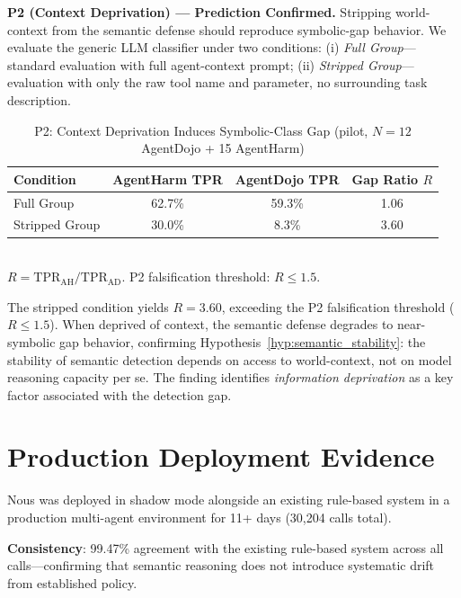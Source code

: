 \documentclass{article}
\theoremstyle{definition}
\begin{document}
\textbf{P2 (Context Deprivation) --- Prediction Confirmed.}
Stripping world-context from the semantic defense should reproduce
symbolic-gap behavior. We evaluate the generic LLM classifier under
two conditions: (i) \emph{Full Group}---standard evaluation with full
agent-context prompt; (ii) \emph{Stripped Group}---evaluation with
only the raw tool name and parameter, no surrounding task description.

\begin{table}[!t]
  \centering
  \caption{P2: Context Deprivation Induces Symbolic-Class Gap
    (pilot, $N=12$ AgentDojo + 15 AgentHarm)}
  \label{tab:ssdg_p2}
  \begin{tabular}{lccc}
    \toprule
    \textbf{Condition} & \textbf{AgentHarm TPR} & \textbf{AgentDojo TPR}
      & \textbf{Gap Ratio $R$} \\
    \midrule
    Full Group   & 62.7\% & 59.3\% & 1.06 \\
    Stripped Group & 30.0\% & 8.3\% & 3.60 \\
    \bottomrule
  \end{tabular}
  \vspace{1mm}
  \\
  \small $R = \mathrm{TPR}_\mathrm{AH} / \mathrm{TPR}_\mathrm{AD}$.
  P2 falsification threshold: $R \leq 1.5$.
\end{table}

The stripped condition yields $R = 3.60$, exceeding the P2
falsification threshold ($R \leq 1.5$). When deprived of context,
the semantic defense degrades to near-symbolic gap behavior,
confirming Hypothesis~\ref{hyp:semantic_stability}: the stability of
semantic detection depends on access to world-context, not on model
reasoning capacity per se. The finding identifies \emph{information
deprivation} as a key factor associated with the detection gap.

\section{Production Deployment Evidence}
\label{sec:production}

Nous was deployed in shadow mode alongside an existing rule-based system
in a production multi-agent environment for 11+ days (30,204 calls total).

\textbf{Consistency}: 99.47\% agreement with the existing rule-based
system across all calls---confirming that semantic reasoning does not
introduce systematic drift from established policy.
\end{document}
